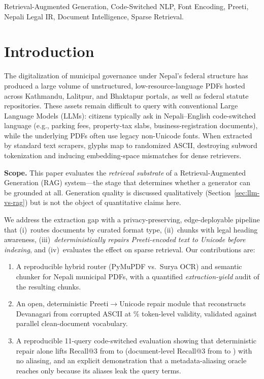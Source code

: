 \documentclass[conference]{IEEEtran}
\begin{document}
\begin{IEEEkeywords}
Retrieval-Augmented Generation, Code-Switched NLP, Font Encoding, Preeti, Nepali Legal IR, Document Intelligence, Sparse Retrieval.
\end{IEEEkeywords}

\section{Introduction}
The digitalization of municipal governance under Nepal's federal structure has produced a large volume of unstructured, low-resource-language PDFs hosted across Kathmandu, Lalitpur, and Bhaktapur portals, as well as federal statute repositories. These assets remain difficult to query with conventional Large Language Models (LLMs): citizens typically ask in Nepali--English code-switched language (e.g., parking fees, property-tax slabs, business-registration documents), while the underlying PDFs often use legacy non-Unicode fonts. When extracted by standard text scrapers, glyphs map to randomized ASCII, destroying subword tokenization and inducing embedding-space mismatches for dense retrievers.

\textbf{Scope.} This paper evaluates the \emph{retrieval substrate} of a Retrieval-Augmented Generation (RAG) system---the stage that determines whether a generator can be grounded at all. Generation quality is discussed qualitatively (Section~\ref{sec:llm-vs-rag}) but is not the object of quantitative claims here.

We address the extraction gap with a privacy-preserving, edge-deployable pipeline that (i)~routes documents by curated format type, (ii)~chunks with legal heading awareness, (iii)~\emph{deterministically repairs Preeti-encoded text to Unicode before indexing}, and (iv)~evaluates the effect on sparse retrieval. Our contributions are:
\begin{enumerate}
  \item A reproducible hybrid router (PyMuPDF vs.\ Surya OCR) and semantic chunker for Nepali municipal PDFs, with a quantified \emph{extraction-yield} audit of the resulting chunks.
  \item An open, deterministic Preeti$\rightarrow$Unicode repair module that reconstructs Devanagari from corrupted ASCII at \repairValidity{}\% token-level validity, validated against parallel clean-document vocabulary.
  \item A reproducible 11-query code-switched evaluation showing that deterministic repair alone lifts Recall@3 from \rawRecall{} to \repRecall{} (document-level Recall@3 from \rawDocRecall{} to \repDocRecall{}) with no aliasing, and an explicit demonstration that a metadata-aliasing oracle reaches \aliRecall{} only because its aliases leak the query terms.
\end{enumerate}
\end{document}

